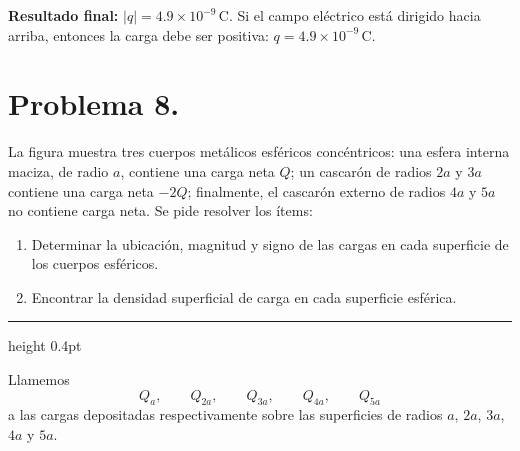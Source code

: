 \documentclass[11pt]{article}
\newcommand{\soluciontitulo}{%
  \par\medskip
  \noindent{\large\bfseries Solución.}\par
  \vspace{0.2em}\hrule height 0.4pt \vspace{0.7em}%
}
\newcommand{\resultadofinal}[1]{%
  \par\medskip
  \noindent\textbf{Resultado final:} #1\par
}
\begin{document}
\resultadofinal{$\boxed{|q|=4.9\times10^{-9}\,\mathrm{C}.}$ Si el campo eléctrico está dirigido hacia arriba, entonces la carga debe ser positiva: $\boxed{q=4.9\times10^{-9}\,\mathrm{C}.}$}

\clearpage


\section*{Problema 8.}
La figura muestra tres cuerpos metálicos esféricos concéntricos: una esfera interna maciza, de radio $a$, contiene una carga neta $Q$; un cascarón de radios $2a$ y $3a$ contiene una carga neta $-2Q$; finalmente, el cascarón externo de radios $4a$ y $5a$ no contiene carga neta. Se pide resolver los ítems:
\begin{enumerate}[label=(\alph*)]
    \item Determinar la ubicación, magnitud y signo de las cargas en cada superficie de los cuerpos esféricos.
    \item Encontrar la densidad superficial de carga en cada superficie esférica.
\end{enumerate}

\soluciontitulo

Llamemos
\begin{equation*}
Q_a,\qquad Q_{2a},\qquad Q_{3a},\qquad Q_{4a},\qquad Q_{5a}
\end{equation*}
a las cargas depositadas respectivamente sobre las superficies de radios $a$, $2a$, $3a$, $4a$ y $5a$.
\end{document}
